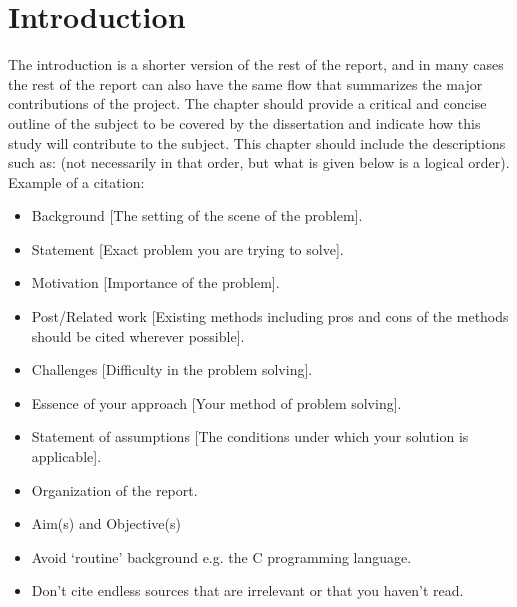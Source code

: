 \chapter{Introduction}

The introduction is a shorter version of the rest of the report, and in many cases the rest of the report can 
also have the same flow that summarizes the major contributions of the project. The chapter should provide a 
critical and concise outline of the subject to be covered by the dissertation and indicate how this study will 
contribute to the subject. This chapter should include the descriptions such as: (not necessarily in that order, 
but what is given below is a logical order). Example of a citation: \cite{bar}
\begin{itemize}
	\item Background [The setting of the scene of the problem].
	\item Statement [Exact problem you are trying to solve]. 
	\item Motivation [Importance of the problem]. 
	\item Post/Related work [Existing methods including pros and cons of the methods should be cited wherever possible].
	\item Challenges [Difficulty in the problem solving].
	\item Essence of your approach [Your method of problem solving].
	\item Statement of assumptions [The conditions under which your solution is applicable].  
	\item Organization of the report. 
	\item Aim(s) and Objective(s)
	\item Avoid ‘routine’ background e.g. the C programming language.
	\item Don’t cite endless sources that are irrelevant or that you haven’t read.
\end{itemize}


